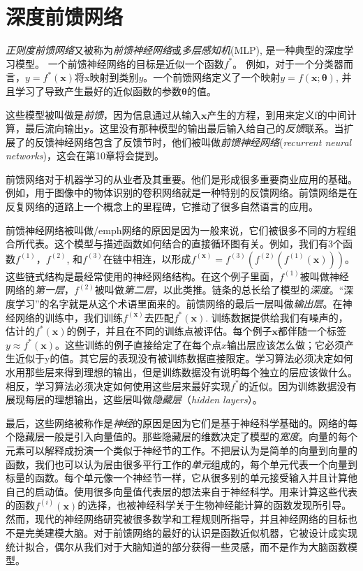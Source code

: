 ﻿\chapter{深度前馈网络}
\label{chap:6}

\emph{正则度前馈网络}又被称为\emph{前馈神经网络}或\emph{多层感知机}(MLP), 是一种典型的深度学习模型。
一个前馈神经网络的目标是近似一个函数$f^*$。
例如，对于一个分类器而言，$y=f^*(\bm{x})$将x映射到类别$y$。一个前馈网络定义了一个映射$y=f(\bm{x};\bm{\theta})$, 并且学习了导致产生最好的近似函数的参数$\bm{\theta}$的值。

这些模型被叫做是\emph{前馈}，因为信息通过从输入$\bm{x}$产生的方程，到用来定义f的中间计算，最后流向输出$\bm{y}$。这里没有那种模型的输出最后输入给自己的\emph{反馈}联系。当扩展了的反馈神经网络包含了反馈节时，他们被叫做\emph{前馈神经网络}(\emph{recurrent neural networks})，这会在第10章将会提到。

前馈网络对于机器学习的从业者及其重要。他们是形成很多重要商业应用的基础。例如，用于图像中的物体识别的卷积网络就是一种特别的反馈网络。前馈网络是在反复网络的道路上一个概念上的里程碑，它推动了很多自然语言的应用。

前馈神经网络被叫做/emph{网络}的原因是因为一般来说，它们被很多不同的方程组合所代表。这个模型与描述函数如何结合的直接循环图有关。例如，我们有3个函数$f^{(1)}$，$f^{(2)}$, 和$f^{(3)}$在链中相连，以形成$f^{(\bm{x})}=f^{(3)}(f^{(2)}(f^{(1)}(\bm{x})))$。
这些链式结构是最经常使用的神经网络结构。在这个例子里面，$f^{(1)}$被叫做神经网络的\emph{第一层}，$f^{(2)}$被叫做\emph{第二层}，以此类推。链条的总长给了模型的\emph{深度}。“深度学习”的名字就是从这个术语里面来的。前馈网络的最后一层叫做\emph{输出层}。在神经网络的训练中，我们训练$f^{(\bm{x})}$去匹配$f^*{(\bm{x})}$. 训练数据提供给我们有噪声的，估计的$f^*{(\bm{x})}$的例子，并且在不同的训练点被评估。每个例子$\bm{x}$都伴随一个标签$y\approx f^*(\bm{x})$。这些训练的例子直接给定了在每个点$x$输出层应该怎么做；它必须产生近似于y的值。其它层的表现没有被训练数据直接限定。学习算法必须决定如何水用那些层来得到理想的输出，但是训练数据没有说明每个独立的层应该做什么。相反，学习算法必须决定如何使用这些层来最好实现$f^*$的近似。因为训练数据没有展现每层的理想输出，这些层叫做\emph{隐藏层}（\emph{hidden layers}）。

最后，这些网络被称作是\emph{神经}的原因是因为它们是基于神经科学基础的。网络的每个隐藏层一般是引入向量值的。那些隐藏层的维数决定了模型的\emph{宽度}。向量的每个元素可以解释成扮演一个类似于神经节的工作。不把层认为是简单的向量到向量的函数，我们也可以认为层由很多平行工作的\emph{单元}组成的，每个单元代表一个向量到标量的函数。每个单元像一个神经节一样，它从很多别的单元接受输入并且计算他自己的启动值。使用很多向量值代表层的想法来自于神经科学。用来计算这些代表的函数$f^(i)(\bm{x})$的选择，也被神经科学关于生物神经能计算的函数发现所引导。然而，现代的神经网络研究被很多数学和工程规则所指导，并且神经网络的目标也不是完美建模大脑。对于前馈网络的最好的认识是函数近似机器，它被设计成实现统计拟合，偶尔从我们对于大脑知道的部分获得一些灵感，而不是作为大脑函数模型。

